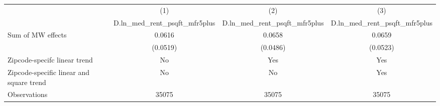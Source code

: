 {
\def\sym#1{\ifmmode^{#1}\else\(^{#1}\)\fi}
\begin{tabular}{l*{3}{c}}
\hline\hline
          &\multicolumn{1}{c}{(1)}&\multicolumn{1}{c}{(2)}&\multicolumn{1}{c}{(3)}\\
          &\multicolumn{1}{c}{D.ln\_med\_rent\_psqft\_mfr5plus}&\multicolumn{1}{c}{D.ln\_med\_rent\_psqft\_mfr5plus}&\multicolumn{1}{c}{D.ln\_med\_rent\_psqft\_mfr5plus}\\
\hline
Sum of MW effects&   0.0616         &   0.0658         &   0.0659         \\
          & (0.0519)         & (0.0486)         & (0.0523)         \\
\hline
Zipcode-specifc linear trend&       No         &      Yes         &      Yes         \\
Zipcode-specific linear and square trend&       No         &       No         &      Yes         \\
Observations&    35075         &    35075         &    35075         \\
\hline\hline
\end{tabular}
}
